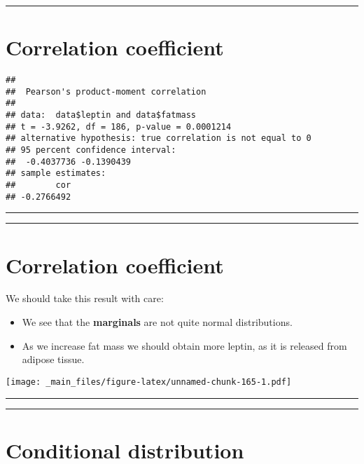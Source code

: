 \documentclass[
]{book}
\providecommand{\tightlist}{%
  \setlength{\itemsep}{0pt}\setlength{\parskip}{0pt}}
\begin{document}
\begin{center}\rule{0.5\linewidth}{0.5pt}\end{center}

\hypertarget{correlation-coefficient-1}{%
\section{Correlation coefficient}\label{correlation-coefficient-1}}

\begin{verbatim}
## 
##  Pearson's product-moment correlation
## 
## data:  data$leptin and data$fatmass
## t = -3.9262, df = 186, p-value = 0.0001214
## alternative hypothesis: true correlation is not equal to 0
## 95 percent confidence interval:
##  -0.4037736 -0.1390439
## sample estimates:
##        cor 
## -0.2766492
\end{verbatim}

\begin{center}\rule{0.5\linewidth}{0.5pt}\end{center}

\begin{center}\rule{0.5\linewidth}{0.5pt}\end{center}

\hypertarget{correlation-coefficient-2}{%
\section{Correlation coefficient}\label{correlation-coefficient-2}}

We should take this result with care:

\begin{itemize}
\tightlist
\item
  We see that the \textbf{marginals} are not quite normal distributions.
\item
  As we increase fat mass we should obtain more leptin, as it is released from adipose tissue.
\end{itemize}

\texttt{[image: \_main\_files/figure-latex/unnamed-chunk-165-1.pdf]}

\begin{center}\rule{0.5\linewidth}{0.5pt}\end{center}

\begin{center}\rule{0.5\linewidth}{0.5pt}\end{center}

\hypertarget{conditional-distribution}{%
\section{Conditional distribution}\label{conditional-distribution}}
\end{document}
